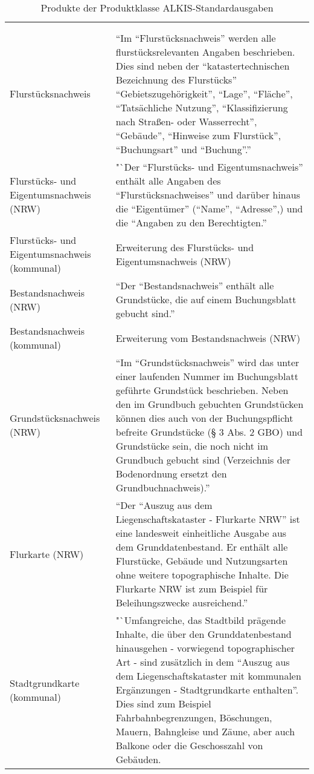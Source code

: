 \begin{longtable}{|p{}|p{}|}
	\caption{Produkte der Produktklasse ALKIS-Standardausgaben} \label{tab-alkis-standard-start} \\
	\hline 
	\head{Produktname} & \head{Beschreibung} \tabularnewline
	\hline 
	\endfirsthead	
		\caption{Produkte der Produktklasse ALKIS-Standardausgaben}  \\
			\hline
	\head{Produktname} & \head{Beschreibung} \tabularnewline
	\hline 
	\endhead	


	Flurstücksnachweis
	&
	"`Im "`Flurstücksnachweis"' werden alle flurstücksrelevanten Angaben beschrieben.
	Dies sind neben der "`katastertechnischen Bezeichnung des Flurstücks"' "`Gebietszugehörigkeit"', "`Lage"',
	"`Fläche"', "`Tatsächliche Nutzung"', "`Klassifizierung nach Straßen- oder Wasserrecht"', "`Gebäude"', "`Hinweise zum Flurstück"', "`Buchungsart"' und "`Buchung"'."' \autocite[269]{adv-alkis-erlaeuterung}
	\\ 
	\hline
	Flurstücks- und Eigentumsnachweis (NRW)
	&
	"`Der "`Flurstücks- und Eigentumsnachweis"' enthält alle Angaben des "`Flurstücksnachweises"'
	und darüber hinaus die "`Eigentümer"' ("`Name"', "`Adresse"',) und die "`Angaben zu den Berechtigten."' \autocite[269]{adv-alkis-erlaeuterung} \\
	\hline
	Flurstücks- und Eigentumsnachweis (kommunal)
	&
	Erweiterung des Flurstücks- und Eigentumsnachweis (NRW)\\
	\hline
	Bestandsnachweis (NRW)
	&
	"`Der "`Bestandsnachweis"' enthält alle Grundstücke, die auf einem Buchungsblatt gebucht sind."' \autocite[269]{adv-alkis-erlaeuterung}  \\
	\hline
	Bestandsnachweis (kommunal)
	&
	Erweiterung vom Bestandsnachweis (NRW) \\
	\hline
	Grundstücksnachweis (NRW)
	&
	"`Im "`Grundstücksnachweis"' wird das unter einer laufenden Nummer im Buchungsblatt geführte Grundstück beschrieben. Neben den im Grundbuch gebuchten Grundstücken können
	dies auch von der Buchungspflicht befreite Grundstücke (§ 3 Abs. 2 GBO) und Grundstücke
	sein, die noch nicht im Grundbuch gebucht sind (Verzeichnis der Bodenordnung ersetzt den
	Grundbuchnachweis)."' \autocite[269]{adv-alkis-erlaeuterung}\\
	\hline
	Flurkarte (NRW)
	&
	"`Der "`Auszug aus dem Liegenschaftskataster - Flurkarte NRW"'  ist eine landesweit einheitliche Ausgabe aus dem Grunddatenbestand. Er enthält alle Flurstücke, Gebäude und Nutzungsarten ohne weitere topographische Inhalte. Die Flurkarte NRW ist zum Beispiel für Beleihungszwecke ausreichend."' \autocite{wupp-alkis} \\
	\hline
	Stadtgrundkarte (kommunal)
	&
	"`Umfangreiche, das Stadtbild prägende Inhalte, die über den Grunddatenbestand hinausgehen - vorwiegend topographischer Art - sind zusätzlich in dem "`Auszug aus dem Liegenschaftskataster mit kommunalen Ergänzungen - Stadtgrundkarte enthalten"'.
	Dies sind zum Beispiel Fahrbahnbegrenzungen, Böschungen, Mauern, Bahngleise und Zäune, aber auch Balkone oder die Geschosszahl von Gebäuden. 
						

\end{longtable}
